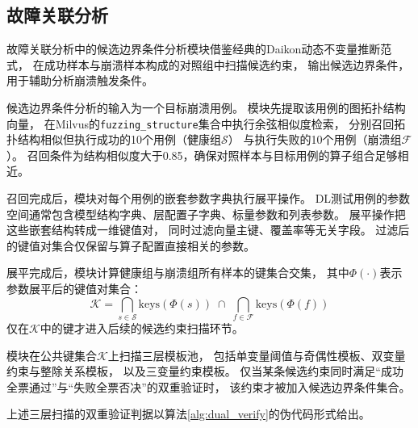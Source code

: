 \subsection{故障关联分析}

故障关联分析中的候选边界条件分析模块借鉴经典的Daikon动态不变量推断范式\cite{ref_daikon}，
在成功样本与崩溃样本构成的对照组中扫描候选约束，
输出候选边界条件，用于辅助分析崩溃触发条件。

候选边界条件分析的输入为一个目标崩溃用例。
模块先提取该用例的图拓扑结构向量，
在Milvus的\texttt{fuzzing\_structure}集合中执行余弦相似度检索，
分别召回拓扑结构相似但执行成功的10个用例（健康组$\mathcal{S}$）
与执行失败的10个用例（崩溃组$\mathcal{F}$）。
召回条件为结构相似度大于0.85，确保对照样本与目标用例的算子组合足够相近。

召回完成后，模块对每个用例的嵌套参数字典执行展平操作。
DL测试用例的参数空间通常包含模型结构字典、层配置子字典、标量参数和列表参数。
展平操作把这些嵌套结构转成一维键值对，
同时过滤向量主键、覆盖率等无关字段。
过滤后的键值对集合仅保留与算子配置直接相关的参数。

展平完成后，模块计算健康组与崩溃组所有样本的键集合交集，
其中$\Phi(\cdot)$表示参数展平后的键值对集合：
\begin{equation}
\label{eq:common_keys}
\mathcal{K} = \bigcap_{s \in \mathcal{S}} \text{keys}(\Phi(s)) \;\cap\; \bigcap_{f \in \mathcal{F}} \text{keys}(\Phi(f))
\end{equation}
仅在$\mathcal{K}$中的键才进入后续的候选约束扫描环节。

模块在公共键集合$\mathcal{K}$上扫描三层模板池，
包括单变量阈值与奇偶性模板、双变量约束与整除关系模板，
以及三变量约束模板。
仅当某条候选约束同时满足“成功全票通过”与“失败全票否决”的双重验证时，
该约束才被加入候选边界条件集合。

上述三层扫描的双重验证判据以算法\ref{alg:dual_verify}的伪代码形式给出。

